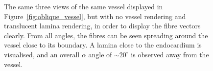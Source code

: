     \begin{figure}[htbp]
      \centering
      \vspace{-2.5em}
      \caption{The same three views of the same vessel displayed in Figure~\ref{fig:oblique_vessel}, but with no vessel rendering and translucent lamina rendering, in order to display the fibre vectors clearly. From all angles, the fibres can be seen spreading around the vessel close to its boundary. A lamina close to the endocardium is visualised, and an overall $\alpha$ angle of $\sim20^\circ$ is observed away from the vessel.}
      \label{fig:oblique_no_vessel}
    \end{figure}
  
